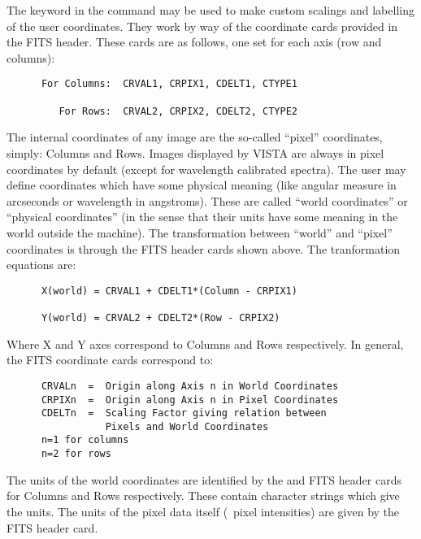 The  keyword in the  command may be used to make custom
scalings and labelling of the user coordinates.  They work by way of the
coordinate cards provided in the FITS header.  These cards are as follows, one
set for each axis (row and columns):
\begin{verbatim}
      For Columns:  CRVAL1, CRPIX1, CDELT1, CTYPE1

         For Rows:  CRVAL2, CRPIX2, CDELT2, CTYPE2
\end{verbatim}
The internal coordinates of any image are the so-called ``pixel'' coordinates,
simply: Columns and Rows.  Images displayed by VISTA are always in pixel
coordinates by default (except for wavelength calibrated spectra).  The user
may define coordinates which have some physical meaning (like angular measure
in arcseconds or wavelength in angstroms).  These are called ``world
coordinates'' or ``physical coordinates'' (in the sense that their units have
some meaning in the world outside the machine).  The transformation between
``world'' and ``pixel'' coordinates is through the FITS header cards shown
above.  The tranformation equations are:
\begin{verbatim}
      X(world) = CRVAL1 + CDELT1*(Column - CRPIX1)

      Y(world) = CRVAL2 + CDELT2*(Row - CRPIX2)
\end{verbatim}
Where X and Y axes correspond to Columns and Rows respectively. In general,
the FITS coordinate cards correspond to:
\begin{verbatim}
      CRVALn  =  Origin along Axis n in World Coordinates
      CRPIXn  =  Origin along Axis n in Pixel Coordinates
      CDELTn  =  Scaling Factor giving relation between
                 Pixels and World Coordinates
      n=1 for columns
      n=2 for rows
\end{verbatim}

The units of the world coordinates are identified by the  and
 FITS header cards for Columns and Rows respectively.  These
contain character strings which give the units.  The units of the pixel data
itself (\eg\ pixel intensities) are given by the  FITS header
card.

